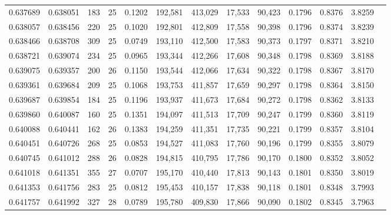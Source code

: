 \begin{tabular}{rrrrrrrrrrrrr}
0.637689 & 0.638051 &   183 &  25 &                                     0.1202 & 192,581 & 413,029 &  17,533 &  90,423 & 0.1796 & 0.8376 & 3.8259 \\
0.638057 & 0.638456 &   220 &  25 &                                     0.1020 & 192,801 & 412,809 &  17,558 &  90,398 & 0.1796 & 0.8374 & 3.8239 \\
0.638466 & 0.638708 &   309 &  25 &                                     0.0749 & 193,110 & 412,500 &  17,583 &  90,373 & 0.1797 & 0.8371 & 3.8210 \\
0.638721 & 0.639074 &   234 &  25 &                                     0.0965 & 193,344 & 412,266 &  17,608 &  90,348 & 0.1798 & 0.8369 & 3.8188 \\
0.639075 & 0.639357 &   200 &  26 &                                     0.1150 & 193,544 & 412,066 &  17,634 &  90,322 & 0.1798 & 0.8367 & 3.8170 \\
0.639361 & 0.639684 &   209 &  25 &                                     0.1068 & 193,753 & 411,857 &  17,659 &  90,297 & 0.1798 & 0.8364 & 3.8150 \\
0.639687 & 0.639854 &   184 &  25 &                                     0.1196 & 193,937 & 411,673 &  17,684 &  90,272 & 0.1798 & 0.8362 & 3.8133 \\
0.639860 & 0.640087 &   160 &  25 &                                     0.1351 & 194,097 & 411,513 &  17,709 &  90,247 & 0.1799 & 0.8360 & 3.8119 \\
0.640088 & 0.640441 &   162 &  26 &                                     0.1383 & 194,259 & 411,351 &  17,735 &  90,221 & 0.1799 & 0.8357 & 3.8104 \\
0.640451 & 0.640726 &   268 &  25 &                                     0.0853 & 194,527 & 411,083 &  17,760 &  90,196 & 0.1799 & 0.8355 & 3.8079 \\
0.640745 & 0.641012 &   288 &  26 &                                     0.0828 & 194,815 & 410,795 &  17,786 &  90,170 & 0.1800 & 0.8352 & 3.8052 \\
0.641018 & 0.641351 &   355 &  27 &                                     0.0707 & 195,170 & 410,440 &  17,813 &  90,143 & 0.1801 & 0.8350 & 3.8019 \\
0.641353 & 0.641756 &   283 &  25 &                                     0.0812 & 195,453 & 410,157 &  17,838 &  90,118 & 0.1801 & 0.8348 & 3.7993 \\
0.641757 & 0.641992 &   327 &  28 &                                     0.0789 & 195,780 & 409,830 &  17,866 &  90,090 & 0.1802 & 0.8345 & 3.7963 \\

\end{tabular}
